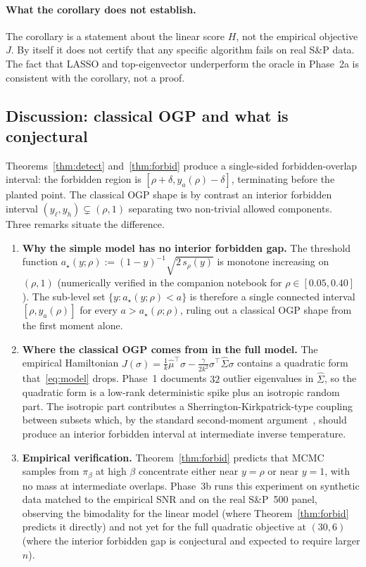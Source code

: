 \paragraph{What the corollary does not establish.} The corollary is a statement about
the linear score $H$, not the empirical objective $J$. By itself it does not certify
that any specific algorithm fails on real S\&P data. The fact that LASSO and
top-eigenvector underperform the oracle in Phase~2a is consistent with the corollary,
not a proof.

\subsection{Discussion: classical OGP and what is conjectural}
\label{ssec:ogp-discussion}

Theorems~\ref{thm:detect} and~\ref{thm:forbid} produce a single-sided forbidden-overlap
interval: the forbidden region is $[\rho+\delta, y_a(\rho)-\delta]$, terminating before
the planted point. The classical OGP shape
is by contrast an interior forbidden interval $(y_\ell, y_h)\subsetneq(\rho,1)$
separating two non-trivial allowed components. Three remarks situate the difference.

\begin{enumerate}
\item \textbf{Why the simple model has no interior forbidden gap.} The threshold
function $a_\star(y;\rho) := (1-y)^{-1}\sqrt{2\, s_\rho(y)}$ is monotone increasing on
$(\rho,1)$ (numerically verified in the companion notebook for $\rho\in[0.05, 0.40]$).
The sub-level set $\{y : a_\star(y;\rho)<a\}$ is therefore a single connected interval
$[\rho, y_a(\rho)]$ for every $a>a_\star(\rho;\rho)$, ruling out a classical OGP shape
from the first moment alone.

\item \textbf{Where the classical OGP comes from in the full model.} The empirical
Hamiltonian $J(\sigma) = \tfrac{1}{k}\hat\mu^\top\sigma - \tfrac{\gamma}{2k^2}\sigma^\top
\hat\Sigma\sigma$ contains a quadratic form that~\eqref{eq:model} drops. Phase~1
documents $32$ outlier eigenvalues in $\hat\Sigma$, so the quadratic form is a low-rank
deterministic spike plus an isotropic random part. The isotropic part contributes a
Sherrington-Kirkpatrick-type coupling between subsets which, by the standard
second-moment argument~\cite{sherrington-kirkpatrick}, should produce
an interior forbidden interval at intermediate inverse temperature.

\item \textbf{Empirical verification.} Theorem~\ref{thm:forbid} predicts that MCMC
samples from $\pi_\beta$ at high $\beta$ concentrate either near $y=\rho$ or near
$y=1$, with no mass at intermediate overlaps. Phase~3b runs this experiment on
synthetic data matched to the empirical SNR and on the real S\&P~500 panel, observing
the bimodality for the linear model (where Theorem~\ref{thm:forbid} predicts it
directly) and not yet for the full quadratic objective at $(30,6)$ (where the interior
forbidden gap is conjectural and expected to require larger $n$).
\end{enumerate}

